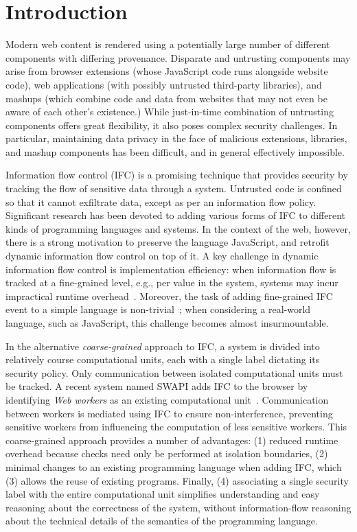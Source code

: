 \section{Introduction}
\label{sec:intro}

Modern web content is rendered using a potentially large number of
different components with differing provenance.
Disparate and untrusting components may arise from browser
extensions (whose JavaScript code runs alongside website
code), web applications (with possibly untrusted third-party
libraries), and mashups (which combine code and data from
websites that may not even be aware of each other's existence.)
While just-in-time combination of untrusting components
offers great flexibility, it also poses complex security challenges.
In particular, maintaining data privacy in the face of malicious
extensions, libraries, and mashup components has been difficult,
and in general effectively impossible.

Information flow control (IFC) is a promising technique
that provides security
by tracking the flow of sensitive data through a system.
Untrusted code is confined so that it cannot exfiltrate data, except as
per an information flow policy.  Significant research has been devoted to
adding various forms of IFC to different kinds of programming languages
and systems.  In the context of the web, however, there is a strong
motivation to preserve the language JavaScript, and retrofit dynamic information
flow control on top of it.  A key challenge in dynamic information
flow control is implementation efficiency: when
information flow is tracked at a fine-grained level,
e.g., per value in the system, systems may incur
impractical runtime overhead~\cite{JSFlow}.
%
Moreover, the task of adding fine-grained IFC event to a simple language is
non-trivial~\cite{hritcu2013testing}; when considering a real-world language,
such as JavaScript, this challenge becomes almost insurmountable.


In the alternative \textit{coarse-grained} approach to IFC,
a system is divided into relatively course computational units,
each with a single label dictating its security policy.
Only
communication between isolated computational units must be tracked.
A recent system named SWAPI adds IFC to the
browser by identifying \emph{Web workers} as an existing computational
unit~\cite{swapi}.  Communication between workers is mediated using
IFC to ensure non-interference, preventing sensitive workers from
influencing the computation of less sensitive workers.
This coarse-grained approach provides a number of advantages:
(1) reduced runtime overhead because checks need only
be performed at isolation boundaries, (2) minimal changes to an
existing programming language when adding IFC, which (3) allows
the reuse of existing programs.  Finally, (4) associating
a single security label with the entire computational unit simplifies
understanding and easy reasoning about the correctness of the
system, without information-flow reasoning about the
technical details of the semantics of the programming language.

